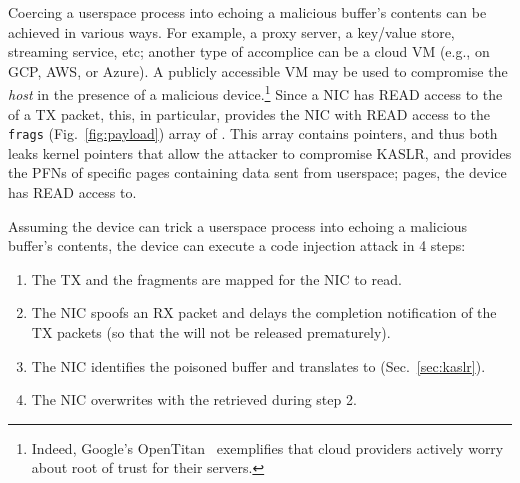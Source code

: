 Coercing a userspace process into echoing a malicious buffer's contents can be achieved in various ways. For example, a proxy server, a key/value store, streaming service, etc; another type of accomplice can be a cloud VM (e.g., on GCP, AWS, or Azure). A publicly accessible VM may be used to compromise the \emph{host} in the presence of a malicious device.\footnote{Indeed, Google's OpenTitan~\cite{opentitan} exemplifies that cloud providers actively worry about root of trust for their servers.}
Since a NIC has READ access to the \shinfo{} of a TX packet, this, in particular, provides the NIC with READ access to the \texttt{frags} (Fig.~\ref{fig:payload}) array of \shinfo{}. This array contains \page{} pointers, and thus both leaks kernel pointers that allow the attacker to compromise KASLR, and provides the PFNs of specific pages containing data sent from userspace; pages, the device has READ access to.


Assuming the device can trick a userspace process into echoing a malicious buffer's contents, the device can execute a code injection attack in 4 steps:

\begin{enumerate}
    \item The TX \data{} and the fragments are mapped for the NIC to read.
    \item The NIC spoofs an RX packet and delays the completion notification of the TX packets (so that the \mabaf{} will not be released prematurely).
    \item The NIC identifies the poisoned buffer and translates \page{} to \kva{} (Sec.~\ref{sec:kaslr}).
    \item The NIC overwrites \shinfo{} with the \kva{} retrieved during step 2. 
\end{enumerate}


